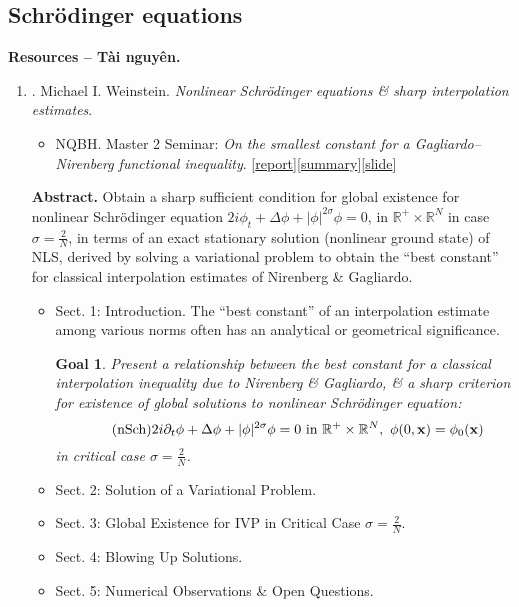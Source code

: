\documentclass{article}
\newtheorem{goal}{Goal}
\begin{document}
\subsection{Schr\"odinger equations}
\textbf{\textsf{Resources -- Tài nguyên.}}
\begin{enumerate}
	\item \cite{Weinstein1983}. {\sc Michael I. Weinstein}. {\it Nonlinear {S}chr\"{o}dinger equations \& sharp interpolation estimates}.
	\begin{itemize}
		\item NQBH. Master 2 Seminar: {\it On the smallest constant for a Gagliardo--Nirenberg functional inequality}. [\href{https://github.com/NQBH/advanced_STEM_beyond/blob/main/Master_of_Science/Master_Seminar/NQBH_Master_seminar.pdf}{report}][\href{https://github.com/NQBH/advanced_STEM_beyond/blob/main/Master_of_Science/Master_Seminar/NQBH_Master_seminar_summary.pdf}{summary}][\href{https://github.com/NQBH/advanced_STEM_beyond/blob/main/Master_of_Science/Master_Seminar/NQBH_Master_seminar_slide.pdf}{slide}]
	\end{itemize}
	{\bf Abstract.} Obtain a sharp sufficient condition for global existence for nonlinear Schr\"odinger equation $2i\phi_t + \Delta\phi + |\phi|^{2\sigma}\phi = 0$, in $\mathbb{R}^+\times\mathbb{R}^N$ in case $\sigma = \frac{2}{N}$, in terms of an exact stationary solution (nonlinear ground state) of NLS, derived by solving a variational problem to obtain the ``best constant'' for classical interpolation estimates of Nirenberg \& Gagliardo.
	\begin{itemize}
		\item {\sf Sect. 1: Introduction.} The ``best constant'' of an interpolation estimate among various norms often has an analytical or geometrical significance.
		\begin{goal}
			Present a relationship between the best constant for a classical interpolation inequality due to Nirenberg \& Gagliardo, \& a sharp criterion for existence of global solutions to nonlinear Schr\"odinger equation:
			\begin{equation}
				\label{nonlinear Schrodinger}
				\tag{nSch}
				2i\partial_t\phi + \Delta\phi + |\phi|^{2\sigma}\phi = 0\mbox{ in }\mathbb{R}^+\times\mathbb{R}^N,\ \phi(0,{\bf x}) = \phi_0({\bf x})
			\end{equation}
			in critical case $\sigma = \frac{2}{N}$.
		\end{goal}
		\item {\sf Sect. 2: Solution of a Variational Problem.}
		\item {\sf Sect. 3: Global Existence for IVP in Critical Case $\sigma = \frac{2}{N}$.}
		\item {\sf Sect. 4: Blowing Up Solutions.}
		\item {\sf Sect. 5: Numerical Observations \& Open Questions.}
	\end{itemize}
\end{enumerate}
\end{document}

